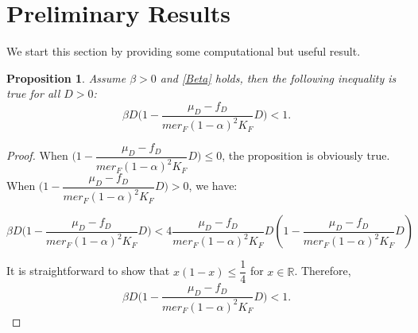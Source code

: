 \documentclass{article}
\newtheorem{prop}{Proposition}
\begin{document}
\section{Preliminary Results}

We start this section by providing some computational but useful result.

\begin{prop} \label{propBeta}
Assume $\beta>0$ and \eqref{Beta} holds, then the following inequality is true for all $D > 0$:
$$
\beta D \Big(1 - \dfrac{\mu_D - f_D}{me r_F (1-\alpha)^2K_F } D\Big) < 1.
$$
\end{prop}

\begin{proof}
When $\Big(1 - \dfrac{\mu_D - f_D}{me r_F (1-\alpha)^2K_F } D\Big) \leq 0$, the proposition is obviously true. When $\Big(1 - \dfrac{\mu_D - f_D}{me r_F (1-\alpha)^2K_F } D\Big) > 0$, we have:

\begin{equation*}
\beta D \Big(1 - \dfrac{\mu_D - f_D}{me r_F (1-\alpha)^2K_F } D\Big) < 4 \dfrac{\mu_D - f_D}{me r_F (1-\alpha)^2K_F } D \left(1 -\dfrac{\mu_D - f_D}{me r_F (1-\alpha)^2K_F } D \right)
\end{equation*}

It is straightforward to show that $x(1 - x) \leq \dfrac{1}{4}$ for $x \in \mathbb{R}$. Therefore,
$$
\beta D \Big(1 - \dfrac{\mu_D - f_D}{me r_F (1-\alpha)^2K_F } D\Big) < 1.
$$
\end{proof}
\end{document}
